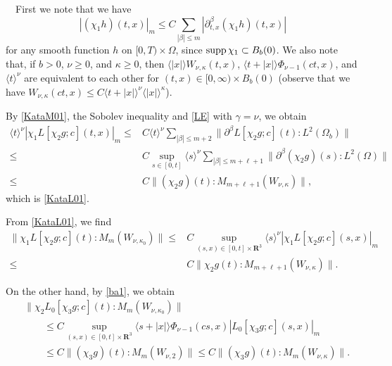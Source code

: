 \documentclass[12pt]{amsart}
\newcommand{\R}{{\mathbf R}}
\newcommand{\pa}{\partial}
\newcommand{\norm}[2]{\|#1 \!:\! #2\|}
\DeclareMathOperator{\supp}{\rm supp}
\numberwithin{equation}{section}
\begin{document}
\ \
First we note that we have
\begin{equation}
|(\chi_1 h)(t,x)|_m\le C \sum_{|\beta|\le m} |\pa_{t, x}^\beta(\chi_1 h)(t,x)|
\label{KataM01}
\end{equation}
for any smooth function $h$ on $[0,T)\times \Omega$,
since $\supp \chi_1\subset B_b(0)$.
We also note that, if $b>0$, $\nu\ge 0$, and $\kappa\ge 0$, then 
$\langle |x|\rangle W_{\nu, \kappa} (t,x)$, 
$\langle{t+|x|}\rangle \Phi_{\nu-1}(ct,x)$, and 
$\langle{t}\rangle^\nu$ are equivalent to each other
for $(t,x)\in [0, \infty)\times B_b(0)$
(observe that we have $W_{\nu, \kappa}(ct,x)\le C\langle t+|x| \rangle^\nu \langle |x|\rangle^\kappa$).

By \eqref{KataM01}, the Sobolev inequality and \eqref{LE} with $\gamma=\nu$, we obtain
\begin{align*}
\langle t \rangle^\nu
|\chi_1 L[ \chi_2 g;c ](t,x)|_m
  \le & C \langle t\rangle^\nu \sum_{|\beta|\le m+2}
        \norm{\pa^\beta L[\chi_2 g;c](t)}{L^2(\Omega_b)}\\
\le & C \sup_{s\in [0,t]} \langle s\rangle^\nu
\sum_{|\beta|\le m+\ell+1} \norm{\pa^\beta (\chi_2g)(s)}{L^2(\Omega)}\\
\le & C \norm{(\chi_2 g)(t)}{M_{m+\ell+1}(W_{\nu,\kappa})},
\end{align*}
which is \eqref{KataL01}.

From \eqref{KataL01}, we find
\begin{align*}
\norm{\chi_1L[\chi_2 g; c](t)}{M_m(W_{\nu, \kappa_0})}\le & 
 C \sup_{(s,x)\in [0,t]\times\R^3}
\langle s\rangle^\nu |\chi_1L[\chi_2g; c](s,x)|_m\\
\le & C\norm{\chi_2 g(t)}{M_{m+\ell+1}(W_{\nu, \kappa})}.
\end{align*}

On the other hand, by \eqref{ba1}, we obtain
\begin{align*}
& \norm{\chi_2L_0[\chi_3g; c](t)}{M_m(W_{\nu, \kappa_0})}\\
& \qquad \le C \sup_{(s,x)\in [0,t]\times \R^3}
 \langle s+|x|\rangle \Phi_{\nu-1}(cs, x) |L_0[\chi_3g; c](s,x)|_m\\
& \qquad \le C \norm{(\chi_3 g)(t)}{M_m(W_{\nu, 2})}
\le C \norm{(\chi_3 g)(t)}{M_m(W_{\nu, \kappa})}.
\end{align*}
\end{document}
